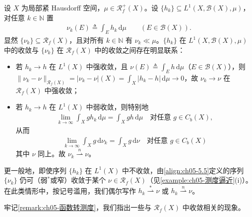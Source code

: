 \documentclass[../../main.tex]{subfiles}%
\begin{document}
\begin{remark}\label{remark:ch05-函数转测度}
设 $X$ 为局部紧 Hausdorff 空间，$\mu\in\mathscr{R}^+_f(X)$。设 $\{h_k\}\subseteq L^1(X,\mathscr{B}(X),\mu)$，对任意 $k\in\mathbb{N}$ 置
\begin{align}
\nu_k(E)\triangleq \int_E h_k\,\mathrm{d}\mu\qquad(E\in\mathscr{B}(X)).\label{align:ch05-5.5}
\end{align}
显然 $\{\nu_k\}\subseteq\mathscr{R}_f(X)$，且对所有 $k\in\mathbb{N}$ 有 $\nu_k\ll\mu$。$\{h_k\}$ 在 $L^1(X,\mathscr{B}(X),\mu)$ 中的收敛与 $\{\nu_k\}$ 在 $\mathscr{R}_f(X)$ 中的收敛之间存在明显联系：
\begin{itemize}
\item 若 $h_k\to h$ 在 $L^1(X)$ 中强收敛，且 $\nu(E)\triangleq \int_E h\,\mathrm{d}\mu$（$E\in\mathscr{B}(X)$），则 $\|\nu_k-\nu\|_{\mathscr{R}_f(X)}=|\nu_k-\nu|(X)=\int_X|h_k-h|\,\mathrm{d}\mu\to0$，故 $\nu_k\to\nu$ 在 $\mathscr{R}_f(X)$ 中强收敛；
\item 若 $h_k\to h$ 在 $L^1(X)$ 中弱收敛，则特别地
\begin{align*}
\lim_{k\to\infty}\int_X g h_k\,\mathrm{d}\mu=\int_X g h\,\mathrm{d}\mu
\quad\text{对任意 }g\in C_b(X),
\end{align*}
从而
\begin{align*}
\lim_{k\to\infty}\int_X g\,\mathrm{d}\nu_k=\int_X g\,\mathrm{d}\nu
\quad\text{对任意 }g\in C_b(X)
\end{align*}
其中 $\nu$ 同上。故 $\nu_k\stackrel{n}{\rightharpoonup}\nu$。
\end{itemize}
更一般地，即使序列 $\{h_k\}$ 在 $L^1(X)$ 中不收敛，由\eqref{align:ch05-5.5}定义的序列 $\{\nu_k\}$ 仍可（弱$^*$或窄）收敛于某个 $\nu\in\mathscr{R}_f(X)$（见\cref{example:ch05-测度逼近}(i)）。在此类情形中，按记号滥用，我们偶尔写作 $h_k\stackrel{*}{\rightharpoonup}\nu$ 或 $h_k\stackrel{n}{\rightharpoonup}\nu$。
\end{remark}

牢记\cref{remark:ch05-函数转测度}，我们指出一些与 $\mathscr{R}_f(X)$ 中收敛相关的现象。
\end{document}
